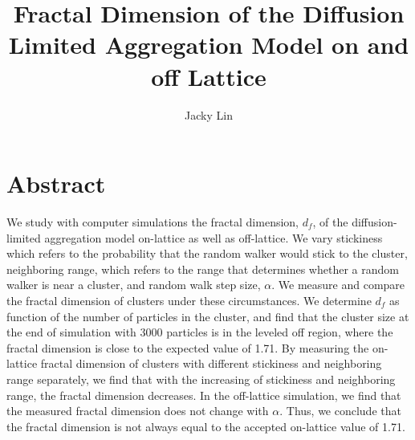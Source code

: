 \documentclass[aps,preprint,groupedaddress,letterpaper]{revtex4-1}
\begin{document}
\title{Fractal Dimension of the Diffusion Limited Aggregation Model on and off Lattice}

\author{Jacky Lin}

\maketitle

\section{Abstract}
We study with computer simulations the fractal dimension, $d_f$, of the diffusion-limited aggregation model on-lattice as well as off-lattice. We vary stickiness which refers to the probability that the random walker would stick to the cluster, neighboring range, which refers to the range that determines whether a random walker is near a cluster, and random walk step size, $\alpha$. We measure and compare the fractal dimension of clusters under these circumstances. We determine $d_f$ as function of the number of particles in the cluster, and find that the cluster size at the end of simulation with 3000 particles is in the leveled off region, where the fractal dimension is close to the expected value of 1.71. By measuring the on-lattice fractal dimension of clusters with different stickiness and neighboring range separately, we find that with the increasing of stickiness and neighboring range, the fractal dimension decreases. In the off-lattice simulation, we find that the measured fractal dimension does not change with $\alpha$. Thus, we conclude that the fractal dimension is not always equal to the accepted on-lattice value of 1.71. 
\end{document}

